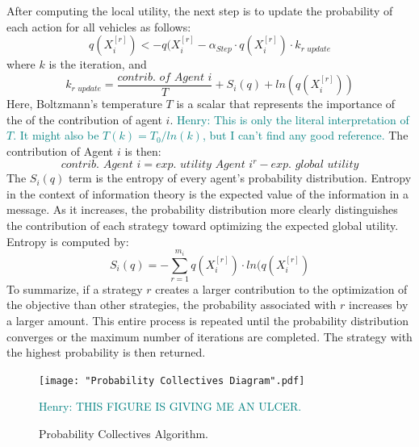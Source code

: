 \documentclass{sig-alternate}
\newcommand{\allcomments}[1]{{#1}}
\newcommand{\hfcomment}[1]{\textcolor{Teal}{\allcomments{Henry: {#1}}}}
\begin{document}
After computing the local utility, the next step is to update the probability of each action for all vehicles as follows:
	\begin{equation}
	q(X_i^{[r]})<-q(X_i^{[r]}-\alpha_{Step}\cdot q(X_i^{[r]})\cdot k_{\textit{r update}}
	\end{equation}
where $k$ is the iteration, and
	\begin{equation}
	k_{\textit{r update}} = \dfrac{\textit{contrib. of Agent }i}{T}+S_i(q)+ln(q(X_i^{[r]}))
	\end{equation}
Here, Boltzmann's temperature $T$  is a scalar that represents the importance of the of the contribution of agent $i$.
\hfcomment{This is only the literal interpretation of $T$. It might also be $T(k)=T_0/ln(k)$, but I can't find any good reference.}
The contribution of Agent $i$ is then:
	\begin{equation}
	\textit{contrib. Agent }i = \textit{exp. utility Agent }i^r - \textit{exp. global utility}
	\end{equation}	
The $S_i(q)$ term is the entropy  of every agent's probability distribution. Entropy in the context of information theory is the expected value of the information in a message. As it increases, the probability distribution more clearly distinguishes the contribution of each strategy toward optimizing the expected global utility. Entropy is computed by:
	\begin{equation}
	S_i(q)=-\sum_{r=1}^{m_i}q(X_i^{[r]})\cdot ln(q(X_i^{[r]})
	\end{equation}
To summarize, if a strategy $r$ creates a larger contribution to the optimization of the objective than other strategies, the probability associated with $r$ increases by a larger amount. This entire process is repeated until the probability distribution converges or the maximum number of iterations are completed. The strategy with the highest probability is then returned. 

\begin{figure}
\centering
\texttt{[image: "Probability Collectives Diagram".pdf]}
\caption{Probability Collectives Algorithm.}
\hfcomment{THIS FIGURE IS GIVING ME AN ULCER.}
\label{fig:PCDiagram}
\end{figure}
\end{document}
